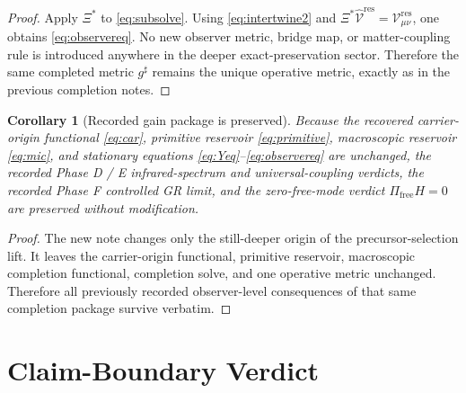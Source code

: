 \documentclass[11pt]{article}
\newcommand{\ObserverMap}{\Xi}
\newcommand{\CompletedMetric}{g^{\sharp}}
\newcommand{\ResidualCore}{\mathcal V_{\mu\nu}^{\mathrm{res}}}
\newcommand{\ResidualLift}{\widehat{\mathcal V}^{\mathrm{res}}}
\newtheorem{corollary}{Corollary}
\begin{document}
\begin{proof}
Apply \(\ObserverMap^*\) to \eqref{eq:subsolve}. Using \eqref{eq:intertwine2} and \(\ObserverMap^*\ResidualLift=\ResidualCore\), one obtains \eqref{eq:observereq}. No new observer metric, bridge map, or matter-coupling rule is introduced anywhere in the deeper exact-preservation sector. Therefore the same completed metric \(\CompletedMetric\) remains the unique operative metric, exactly as in the previous completion notes.
\end{proof}

\begin{corollary}[Recorded gain package is preserved]
\label{cor:gains}
Because the recovered carrier-origin functional \eqref{eq:car}, primitive reservoir \eqref{eq:primitive}, macroscopic reservoir \eqref{eq:mic}, and stationary equations \eqref{eq:Yeq}--\eqref{eq:observereq} are unchanged, the recorded Phase D / E infrared-spectrum and universal-coupling verdicts, the recorded Phase F controlled GR limit, and the zero-free-mode verdict \(\Pi_{\mathrm{free}}H=0\) are preserved without modification.
\end{corollary}

\begin{proof}
The new note changes only the still-deeper origin of the precursor-selection lift. It leaves the carrier-origin functional, primitive reservoir, macroscopic completion functional, completion solve, and one operative metric unchanged. Therefore all previously recorded observer-level consequences of that same completion package survive verbatim.
\end{proof}

\section{Claim-Boundary Verdict}
\end{document}
